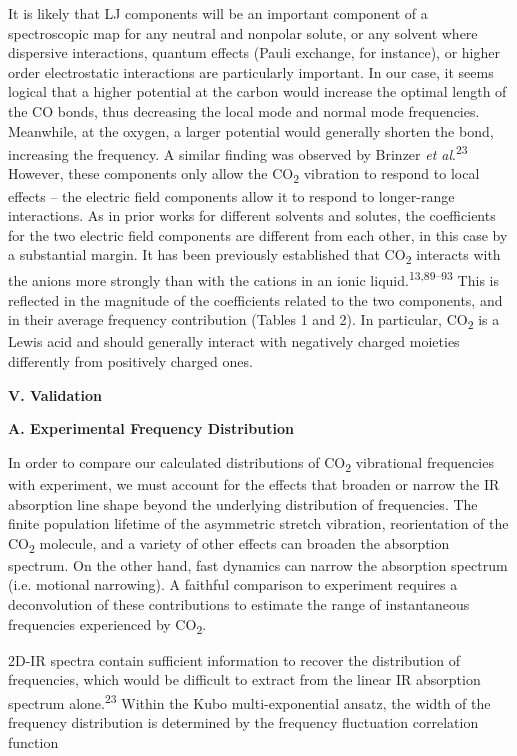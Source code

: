 \documentclass[]{article}
\begin{document}
It is likely that LJ components will be an important component of a
spectroscopic map for any neutral and nonpolar solute, or any solvent
where dispersive interactions, quantum effects (Pauli exchange, for
instance), or higher order electrostatic interactions are particularly
important. In our case, it seems logical that a higher potential at the
carbon would increase the optimal length of the CO bonds, thus
decreasing the local mode and normal mode frequencies. Meanwhile, at the
oxygen, a larger potential would generally shorten the bond, increasing
the frequency. A similar finding was observed by Brinzer \emph{et
al}.\textsuperscript{23} However, these components only allow the
CO\textsubscript{2} vibration to respond to local effects -- the
electric field components allow it to respond to longer-range
interactions. As in prior works for different solvents and solutes, the
coefficients for the two electric field components are different from
each other, in this case by a substantial margin. It has been previously
established that CO\textsubscript{2} interacts with the anions more
strongly than with the cations in an ionic
liquid.\textsuperscript{13,89--93} This is reflected in the magnitude of
the coefficients related to the two components, and in their average
frequency contribution (Tables 1 and 2). In particular,
CO\textsubscript{2} is a Lewis acid and should generally interact with
negatively charged moieties differently from positively charged ones.

\textbf{V. Validation }

\textbf{A. Experimental Frequency Distribution }

In order to compare our calculated distributions of CO\textsubscript{2}
vibrational frequencies with experiment, we must account for the effects
that broaden or narrow the IR absorption line shape beyond the
underlying distribution of frequencies. The finite population lifetime
of the asymmetric stretch vibration, reorientation of the
CO\textsubscript{2} molecule, and a variety of other effects can broaden
the absorption spectrum. On the other hand, fast dynamics can narrow the
absorption spectrum (i.e. motional narrowing). A faithful comparison to
experiment requires a deconvolution of these contributions to estimate
the range of instantaneous frequencies experienced by
CO\textsubscript{2}.

2D-IR spectra contain sufficient information to recover the distribution
of frequencies, which would be difficult to extract from the linear IR
absorption spectrum alone.\textsuperscript{23} Within the Kubo
multi-exponential ansatz, the width of the frequency distribution is
determined by the frequency fluctuation correlation function
\end{document}
